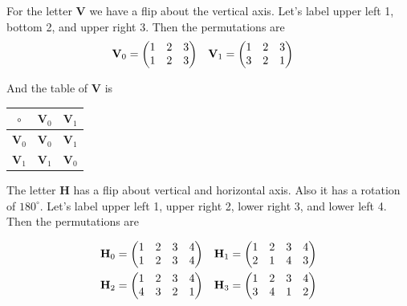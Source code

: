 \documentclass[twoside]{amsart}
\begin{document}
\begin{enumerate}[A.]
\begin{enumerate}[1]
      For the letter \textbf{V} we have a flip about the vertical axis. Let's
      label upper left 1, bottom 2, and upper right 3. Then the permutations 
      are
      \begin{align*}
         \text{\textbf{V}}_0 &= \begin{pmatrix}
	                        1 & 2 & 3 \\
				1 & 2 & 3 
				\end{pmatrix}
				&
	 \text{\textbf{V}}_1 &= \begin{pmatrix}
	                        1 & 2 & 3 \\
				3 & 2 & 1
				\end{pmatrix}
      \end{align*}

      And the table of \textbf{V} is
      \begin{tabular}{c|cc}
        $\circ$ & $\textbf{V}_0$ & $\textbf{V}_1$ \\ \hline
	$\textbf{V}_0$ & $\textbf{V}_0$ & $\textbf{V}_1$ \\
	$\textbf{V}_1$ & $\textbf{V}_1$ & $\textbf{V}_0$ \\
      \end{tabular}


      The letter \textbf{H} has a flip about vertical and horizontal axis.
      Also it has a rotation of $180^\circ$. Let's label upper left 1,
      upper right 2, lower right 3, and lower left 4. Then the permutations 
      are

      \begin{align*}
          \text{\textbf{H}}_0 &= \begin{pmatrix}
	                            1 & 2 & 3 & 4 \\
				    1 & 2 & 3 & 4
				 \end{pmatrix}
				 &
	  \text{\textbf{H}}_1 &= \begin{pmatrix}
	                            1 & 2 & 3 & 4\\
				    2 & 1 & 4 & 3
				 \end{pmatrix}
				 \\
	  \text{\textbf{H}}_2 &= \begin{pmatrix}
	                            1 & 2 & 3 & 4\\
				    4 & 3 & 2 & 1
				 \end{pmatrix}
				 &
	  \text{\textbf{H}}_3 &= \begin{pmatrix}
	                            1 & 2 & 3 & 4\\
				    3 & 4 & 1 & 2
				 \end{pmatrix}
      \end{align*}


\end{enumerate}
\end{enumerate}
\end{document}
